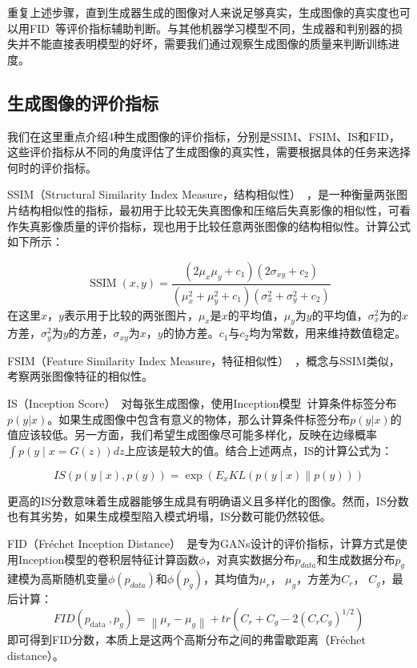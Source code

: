 重复上述步骤，直到生成器生成的图像对人来说足够真实，生成图像的真实度也可以用FID~\cite{fid}等评价指标辅助判断。与其他机器学习模型不同，生成器和判别器的损失并不能直接表明模型的好坏，需要我们通过观察生成图像的质量来判断训练进度。

\subsection{生成图像的评价指标}

我们在这里重点介绍4种生成图像的评价指标，分别是SSIM、FSIM、IS和FID，这些评价指标从不同的角度评估了生成图像的真实性，需要根据具体的任务来选择何时的评价指标。

SSIM（Structural Similarity Index Measure，结构相似性）~\cite{ssim}，是一种衡量两张图片结构相似性的指标，最初用于比较无失真图像和压缩后失真影像的相似性，可看作失真影像质量的评价指标，现也用于比较任意两张图像的结构相似性。计算公式如下所示：

\begin{equation}
    \operatorname{SSIM}(x, y)=\frac{\left(2 \mu_{x} \mu_{y}+c_{1}\right)\left(2 \sigma_{x y}+c_{2}\right)}{\left(\mu_{x}^{2}+\mu_{y}^{2}+c_{1}\right)\left(\sigma_{x}^{2}+\sigma_{y}^{2}+c_{2}\right)}
\end{equation}
在这里$x$，$y$表示用于比较的两张图片，$\mu_{x}$是$x$的平均值，$\mu_{y}$为$y$的平均值，$\sigma_{x}^{2}$为的$x$方差，$\sigma_{y}^{2}$为$y$的方差，$\sigma_{x y}$为$x$，$y$的协方差。$c_{1}$与$c_{2}$均为常数，用来维持数值稳定。

FSIM（Feature Similarity Index Measure，特征相似性）~\cite{fsim}，概念与SSIM类似，考察两张图像特征的相似性。

IS（Inception Score）~\cite{salimans2016improved}对每张生成图像，使用Inception模型~\cite{inception}计算条件标签分布$p(y|x)$。如果生成图像中包含有意义的物体，那么计算条件标签分布$p(y|x)$的值应该较低。另一方面，我们希望生成图像尽可能多样化，反映在边缘概率$\int p(y \mid x=G(z)) dz$上应该是较大的值。结合上述两点，IS的计算公式为：

\begin{equation}
    IS\left(p(y \mid x), p(y)\right)=\exp \left(E_{x} K L(p(y \mid x) \| p(y))\right)
\end{equation}

更高的IS分数意味着生成器能够生成具有明确语义且多样化的图像。然而，IS分数也有其劣势，如果生成模型陷入模式坍塌，IS分数可能仍然较低。

FID（Fréchet Inception Distance）~\cite{fid}是专为GANs设计的评价指标，计算方式是使用Inception模型的卷积层特征计算函数$\phi$，对真实数据分布$p_{data}$和生成数据分布$p_{g}$建模为高斯随机变量$\phi (p_{data})$和$\phi (p_{g})$，其均值为$\mu_{r}$， $\mu_{g}$，方差为$C_{r}$， $C_{g}$，最后计算：
\begin{equation}
    F I D\left(p_{\text {data }}, p_{g}\right)=\left\|\mu_{r}-\mu_{g}\right\| + tr\left(C_{r}+C_{g}-2\left(C_{r} C_{g}\right)^{1 / 2}\right)
\end{equation}
即可得到FID分数，本质上是这两个高斯分布之间的弗雷歇距离（Fréchet distance）。

